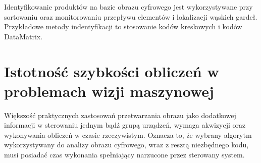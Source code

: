 \documentclass[document.tex]{subfiles}
\begin{document}

	\indent Identyfikowanie produktów na bazie obrazu cyfrowego jest wykorzystywane przy sortowaniu
	oraz monitorowaniu przepływu elementów i lokalizacji wąskich gardeł.
	Przykładowe metody indentyfikacji to stosowanie kodów kreskowych i kodów DataMatrix.\cite{Machine_Vision_Intro}


\section{Istotność szybkości obliczeń w problemach wizji maszynowej}
\indent Większość praktycznych zastosowań przetwarzania obrazu jako dodatkowej 
informacji w sterowaniu jednym bądź grupą urządzeń, wymaga akwizycji oraz wykonywania
obliczeń w czasie rzeczywistym. Oznacza to, że wybrany algorytm wykorzystywany do 
analizy obrazu cyfrowego, wraz z resztą niezbędnego kodu, musi posiadać czas wykonania 
spełniający narzucone przez sterowany system.
\end{document}
